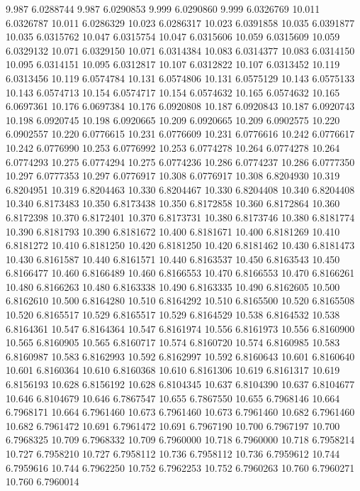 9.987 6.0288744
9.987 6.0290853
9.999 6.0290860
9.999 6.0326769
10.011 6.0326787
10.011 6.0286329
10.023 6.0286317
10.023 6.0391858
10.035 6.0391877
10.035 6.0315762
10.047 6.0315754
10.047 6.0315606
10.059 6.0315609
10.059 6.0329132
10.071 6.0329150
10.071 6.0314384
10.083 6.0314377
10.083 6.0314150
10.095 6.0314151
10.095 6.0312817
10.107 6.0312822
10.107 6.0313452
10.119 6.0313456
10.119 6.0574784
10.131 6.0574806
10.131 6.0575129
10.143 6.0575133
10.143 6.0574713
10.154 6.0574717
10.154 6.0574632
10.165 6.0574632
10.165 6.0697361
10.176 6.0697384
10.176 6.0920808
10.187 6.0920843
10.187 6.0920743
10.198 6.0920745
10.198 6.0920665
10.209 6.0920665
10.209 6.0902575
10.220 6.0902557
10.220 6.0776615
10.231 6.0776609
10.231 6.0776616
10.242 6.0776617
10.242 6.0776990
10.253 6.0776992
10.253 6.0774278
10.264 6.0774278
10.264 6.0774293
10.275 6.0774294
10.275 6.0774236
10.286 6.0774237
10.286 6.0777350
10.297 6.0777353
10.297 6.0776917
10.308 6.0776917
10.308 6.8204930
10.319 6.8204951
10.319 6.8204463
10.330 6.8204467
10.330 6.8204408
10.340 6.8204408
10.340 6.8173483
10.350 6.8173438
10.350 6.8172858
10.360 6.8172864
10.360 6.8172398
10.370 6.8172401
10.370 6.8173731
10.380 6.8173746
10.380 6.8181774
10.390 6.8181793
10.390 6.8181672
10.400 6.8181671
10.400 6.8181269
10.410 6.8181272
10.410 6.8181250
10.420 6.8181250
10.420 6.8181462
10.430 6.8181473
10.430 6.8161587
10.440 6.8161571
10.440 6.8163537
10.450 6.8163543
10.450 6.8166477
10.460 6.8166489
10.460 6.8166553
10.470 6.8166553
10.470 6.8166261
10.480 6.8166263
10.480 6.8163338
10.490 6.8163335
10.490 6.8162605
10.500 6.8162610
10.500 6.8164280
10.510 6.8164292
10.510 6.8165500
10.520 6.8165508
10.520 6.8165517
10.529 6.8165517
10.529 6.8164529
10.538 6.8164532
10.538 6.8164361
10.547 6.8164364
10.547 6.8161974
10.556 6.8161973
10.556 6.8160900
10.565 6.8160905
10.565 6.8160717
10.574 6.8160720
10.574 6.8160985
10.583 6.8160987
10.583 6.8162993
10.592 6.8162997
10.592 6.8160643
10.601 6.8160640
10.601 6.8160364
10.610 6.8160368
10.610 6.8161306
10.619 6.8161317
10.619 6.8156193
10.628 6.8156192
10.628 6.8104345
10.637 6.8104390
10.637 6.8104677
10.646 6.8104679
10.646 6.7867547
10.655 6.7867550
10.655 6.7968146
10.664 6.7968171
10.664 6.7961460
10.673 6.7961460
10.673 6.7961460
10.682 6.7961460
10.682 6.7961472
10.691 6.7961472
10.691 6.7967190
10.700 6.7967197
10.700 6.7968325
10.709 6.7968332
10.709 6.7960000
10.718 6.7960000
10.718 6.7958214
10.727 6.7958210
10.727 6.7958112
10.736 6.7958112
10.736 6.7959612
10.744 6.7959616
10.744 6.7962250
10.752 6.7962253
10.752 6.7960263
10.760 6.7960271
10.760 6.7960014
